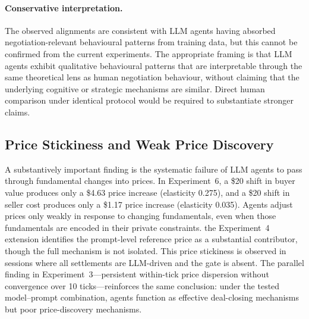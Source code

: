 \paragraph{Conservative interpretation.}
The observed alignments are consistent with LLM agents having absorbed negotiation-relevant behavioural patterns from training data, but this cannot be confirmed from the current experiments.  The appropriate framing is that LLM agents exhibit qualitative behavioural patterns that are interpretable through the same theoretical lens as human negotiation behaviour, without claiming that the underlying cognitive or strategic mechanisms are similar.  Direct human comparison under identical protocol would be required to substantiate stronger claims.

\subsection{Price Stickiness and Weak Price Discovery}
\label{sec:disc-failure}

A substantively important finding is the systematic failure of LLM agents to pass through fundamental changes into prices.  In Experiment~6, a \$20 shift in buyer value produces only a \$4.63 price increase (elasticity 0.275), and a \$20 shift in seller cost produces only a \$1.17 price increase (elasticity 0.035).  Agents adjust prices only weakly in response to changing fundamentals, even when those fundamentals are encoded in their private constraints.  the Experiment~4 extension identifies the prompt-level reference price as a substantial contributor, though the full mechanism is not isolated.  This price stickiness is observed in sessions where all settlements are LLM-driven and the gate is absent.  The parallel finding in Experiment~3---persistent within-tick price dispersion without convergence over 10 ticks---reinforces the same conclusion: under the tested model--prompt combination, agents function as effective deal-closing mechanisms but poor price-discovery mechanisms.


